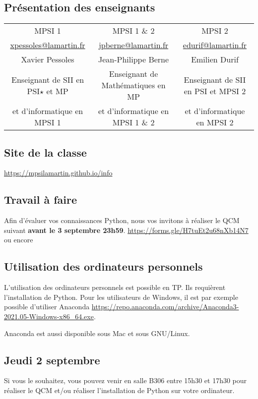 
\subsection*{Présentation des enseignants}


\begin{center}
\begin{tabular}{ccc}
MPSI 1 & MPSI 1 \& 2 & MPSI 2 \\
\url{xpessoles@lamartin.fr} & \url{jpberne@lamartin.fr} & \url{edurif@lamartin.fr} \\
Xavier Pessoles & Jean-Philippe Berne & Emilien Durif \\
Enseignant de SII en PSI$\star$ et MP  & Enseignant de Mathématiques en MP & Enseignant de SII en PSI et MPSI 2 \\  
et d'informatique en MPSI 1 &  et d'informatique en MPSI 1 \& 2  &  et d'informatique en MPSI 2 \\
\end{tabular}
\end{center}


\subsection*{Site de la classe}
\begin{center}
\url{https://mpsilamartin.github.io/info}
\end{center}

\subsection*{Travail à faire }

Afin d'évaluer vos connaissances Python, nous vos invitons à réaliser le QCM suivant \textbf{avant le 3 septembre 23h59}.
\url{https://forms.gle/H7tuEt2u68nXb14N7} ou encore 


\begin{center}


\end{center}

\vspace{.5cm}


\subsection*{Utilisation des ordinateurs personnels}

L'utilisation des ordinateurs personnels est possible en TP. Ils requièrent l'installation de Python. Pour les utilisateurs de Windows, il est par exemple possible d'utiliser Anaconda \url{https://repo.anaconda.com/archive/Anaconda3-2021.05-Windows-x86_64.exe}. 

Anaconda est aussi disponible sous Mac et sous GNU/Linux.



\subsection*{Jeudi 2 septembre}

Si vous le souhaitez, vous pouvez venir en salle B306 entre 15h30 et 17h30 pour réaliser le QCM et/ou réaliser l'installation de Python sur votre ordinateur.

